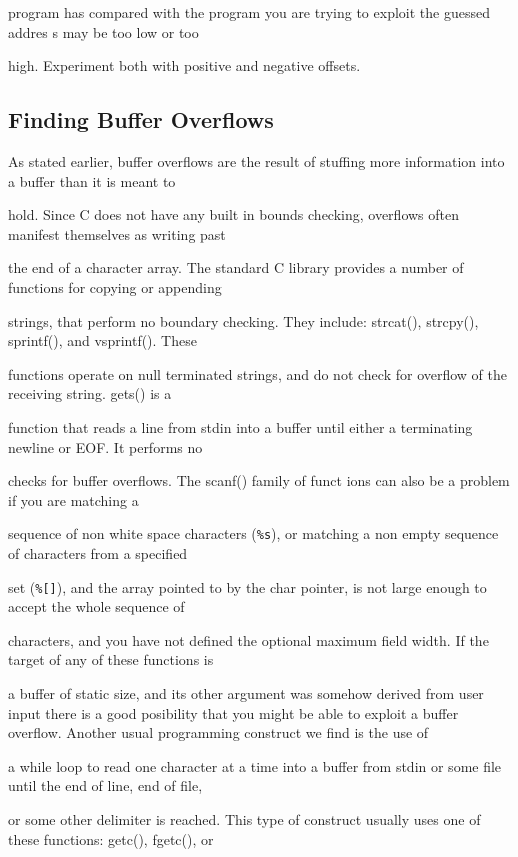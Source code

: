 \documentclass[10pt]{article}
\begin{document}
\begin{CJK}{UTF8}{bsmi}
program has compared with the program you are trying to exploit the guessed addres s may be too low or too 

high. Experiment both with positive and negative offsets. 

\subsection{Finding Buffer Overflows}

As stated earlier, buffer overflows are the result of stuffing more information into a buffer than it is meant to 

hold. Since C does not have any built in bounds checking, overflows often manifest themselves as writing past 

the end of a character array. The standard C library provides a number of functions for copying or appending  

strings, that perform no boundary checking. They include: strcat(), strcpy(), sprintf(), and vsprintf(). These 

functions operate on null terminated strings, and do not check for overflow of the receiving string. gets() is a 

function that reads a line from stdin into a buffer until either a terminating newline or EOF. It performs no 

checks for buffer overflows. The scanf() family of funct ions can also be a problem if you are matching a 

sequence of non white space characters (\verb+%s+),  or matching a non empty sequence of characters from a specified 

set (\verb+%[]+), and the array pointed to by the char pointer, is not large enough to accept the whole sequence of 

characters,  and you have not defined the optional maximum field width. If the target of any of these functions is 

a buffer of static size, and its other argument was somehow derived from user input there is a good posibility that you might be able to exploit a buffer overflow. Another usual programming construct we find is the use of 

a while loop to read one character at a time into a buffer from stdin or some file until the end of line, end of file, 

or some other delimiter is reached. This type of construct usually uses one of these functions: getc(), fgetc(), or 


\end{CJK}
\end{document}
